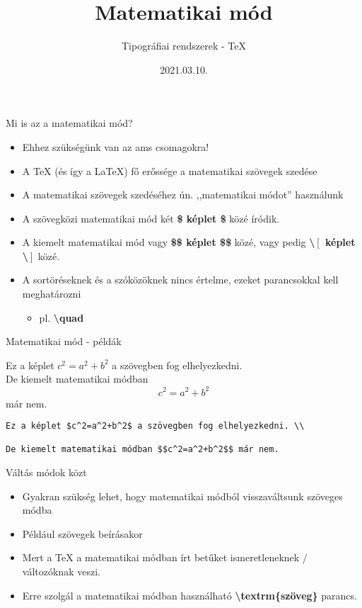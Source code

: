 \documentclass[11pt]{beamer}
\author{Tipográfiai rendszerek - \TeX}
\title{Matematikai mód}
\date{2021.03.10.}
\newcommand{\tbs}{\textbackslash}
\begin{document}
\begin{frame}
\titlepage
\end{frame}

\begin{frame}{Mi is az a matematikai mód?}
\begin{itemize}
\item 	Ehhez szükségünk van az ams csomagokra!
\item	A \TeX{} (és így a \LaTeX{}) fő erőssége a matematikai szövegek szedése
\item	A matematikai szövegek szedéséhez ún. ,,matematikai módot'' használunk
\item	A szövegközi matematikai mód két \textbf{\$ képlet \$} közé íródik.
\item 	A kiemelt matematikai mód vagy \textbf{\$\$ képlet \$\$} közé, vagy pedig \textbf{\tbs $\left[ \right.$ képlet \tbs $\left. \right]$} közé.
\item 	A sortöréseknek és a szóközöknek nincs értelme, ezeket parancsokkal kell meghatározni
	\begin{itemize}
	\item pl. \textbf{\tbs quad}
	\end{itemize}
\end{itemize}
\end{frame}

\begin{frame}[fragile]{Matematikai mód - példák}

Ez a képlet $c^2=a^2+b^2$ a szövegben fog elhelyezkedni. \\

De kiemelt matematikai módban $$c^2=a^2+b^2$$ már nem.

\vspace{1cm}

\begin{verbatim}
Ez a képlet $c^2=a^2+b^2$ a szövegben fog elhelyezkedni. \\

De kiemelt matematikai módban $$c^2=a^2+b^2$$ már nem.
\end{verbatim}
\end{frame}

\begin{frame}{Váltás módok közt}
\begin{itemize}
\item Gyakran szükség lehet, hogy matematikai módból visszaváltsunk szöveges módba
\item Például szövegek beírásakor
\item Mert a \TeX{} a matematikai módban írt betűket ismeretleneknek / változóknak veszi.
\item Erre szolgál a matematikai módban használható \textbf{\tbs textrm\{szöveg\}} parancs.
\end{itemize}
\end{frame}
\end{document}
